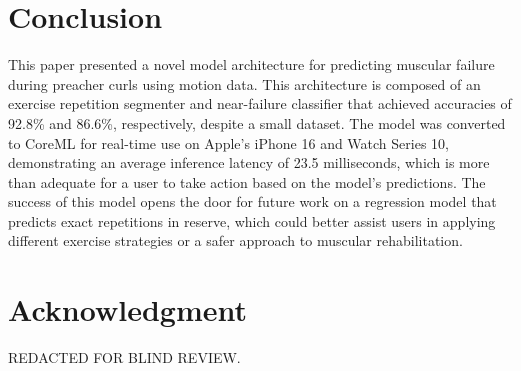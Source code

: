 \documentclass[conference]{IEEEtran}
\begin{document}
\section{Conclusion}
This paper presented a novel model architecture for predicting muscular failure during preacher curls using motion data. This architecture is composed of an exercise repetition segmenter and near-failure classifier that achieved accuracies of 92.8\% and 86.6\%, respectively, despite a small dataset. The model was converted to CoreML for real-time use on Apple's iPhone 16 and Watch Series 10, demonstrating an average inference latency of 23.5 milliseconds, which is more than adequate for a user to take action based on the model's predictions.  The success of this model opens the door for future work on a regression model that predicts exact repetitions in reserve, which could better assist users in applying different exercise strategies or a safer approach to muscular rehabilitation.

\section*{Acknowledgment}
REDACTED FOR BLIND REVIEW.




\end{document}
